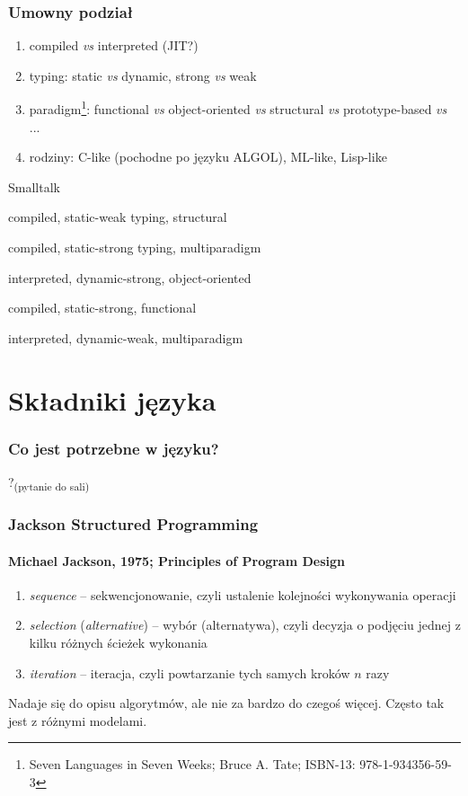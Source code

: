 \documentclass[aspectratio=169]{beamer}
\begin{document}
\begin{frame}
    \frametitle{Umowny podział}

    \begin{enumerate}
        \item compiled \emph{vs} interpreted (JIT?)
        \item typing: static \emph{vs} dynamic, strong \emph{vs} weak
        \item paradigm\footnote{Seven Languages in Seven Weeks; Bruce A. Tate;
            ISBN-13: 978-1-934356-59-3}: functional \emph{vs} object-oriented
            \emph{vs} structural \emph{vs} prototype-based \emph{vs} ...
        \item rodziny: C-like (pochodne po języku ALGOL), ML-like, Lisp-like
    \end{enumerate}

    \vspace{1em}

    \begin{labeling}{Smalltalk}
        \item[C] compiled, static-weak typing, structural
        \item[C++] compiled, static-strong typing, multiparadigm
        \item[Smalltalk] interpreted, dynamic-strong, object-oriented
        \item[OCaml] compiled, static-strong, functional
        \item[Perl] interpreted, dynamic-weak, multiparadigm
    \end{labeling}
\end{frame}

\section{Składniki języka}

\begin{frame}
    \frametitle{Co jest potrzebne w języku?}

    ?{\tiny \textsubscript{(pytanie do sali)}}
\end{frame}

\begin{frame}
    \frametitle{Jackson Structured Programming}
    \framesubtitle{Michael Jackson, 1975; Principles of Program Design}

    \begin{enumerate}
        \item \emph{sequence} -- sekwencjonowanie, czyli ustalenie kolejności
            wykonywania operacji
        \item \emph{selection} (\emph{alternative}) -- wybór (alternatywa),
            czyli decyzja o podjęciu jednej z kilku różnych ścieżek wykonania
        \item \emph{iteration} -- iteracja, czyli powtarzanie tych samych kroków
            $n$ razy
    \end{enumerate}

    \vspace{1em}

    Nadaje się do opisu algorytmów, ale nie za bardzo do czegoś więcej. Często
    tak jest z różnymi modelami.
\end{frame}
\end{document}
